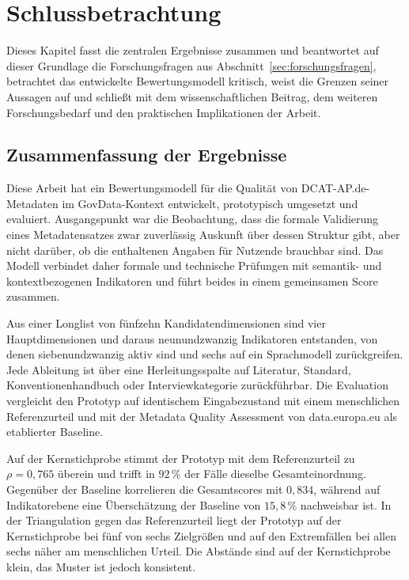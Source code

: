 \pagebreak

\chapter{Schlussbetrachtung}
\label{sec:chapter_07}

Dieses Kapitel fasst die zentralen Ergebnisse zusammen
und beantwortet auf dieser Grundlage die Forschungsfragen aus
Abschnitt~\ref{sec:forschungsfragen}, betrachtet das entwickelte
Bewertungsmodell kritisch, weist die Grenzen seiner Aussagen auf und schließt mit dem wissenschaftlichen Beitrag, dem weiteren Forschungsbedarf und den praktischen Implikationen der
Arbeit.

\section{Zusammenfassung der Ergebnisse}
\label{sec:fazit_zusammenfassung}

Diese Arbeit hat ein Bewertungsmodell für die Qualität von DCAT-AP.de-Metadaten
im GovData-Kontext entwickelt, prototypisch umgesetzt und evaluiert. Ausgangspunkt
war die Beobachtung, dass die formale Validierung eines Metadatensatzes zwar
zuverlässig Auskunft über dessen Struktur gibt, aber nicht darüber, ob die
enthaltenen Angaben für Nutzende brauchbar sind. Das Modell verbindet daher
formale und technische Prüfungen mit semantik- und kontextbezogenen Indikatoren
und führt beides in einem gemeinsamen Score zusammen.

Aus einer Longlist von fünfzehn Kandidatendimensionen sind vier Hauptdimensionen
und daraus neunundzwanzig Indikatoren entstanden, von denen siebenundzwanzig
aktiv sind und sechs auf ein Sprachmodell zurückgreifen. Jede Ableitung ist über
eine Herleitungsspalte auf Literatur, Standard, Konventionenhandbuch oder
Interviewkategorie zurückführbar. Die Evaluation vergleicht den Prototyp auf
identischem Eingabezustand mit einem menschlichen Referenzurteil und mit der
Metadata Quality Assessment von data.europa.eu als etablierter Baseline.

Auf der Kernstichprobe stimmt der Prototyp mit dem Referenzurteil zu
$\rho = 0{,}765$ überein und trifft in $92\,\%$ der Fälle dieselbe
Gesamteinordnung. Gegenüber der Baseline korrelieren die Gesamtscores mit
$0{,}834$, während auf Indikatorebene eine Überschätzung der Baseline von
$15{,}8\,\%$ nachweisbar ist. In der Triangulation gegen das Referenzurteil liegt
der Prototyp auf der Kernstichprobe bei fünf von sechs Zielgrößen und auf den
Extremfällen bei allen sechs näher am menschlichen Urteil. Die Abstände sind auf
der Kernstichprobe klein, das Muster ist jedoch konsistent.

